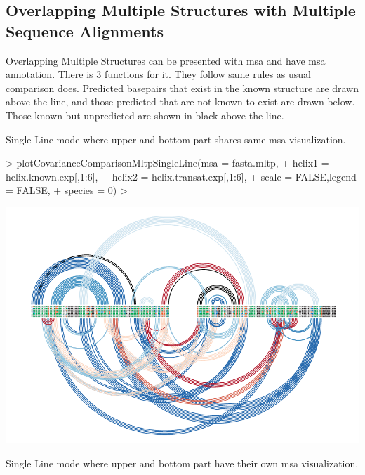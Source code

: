 \documentclass[letterpaper]{article}
\begin{document}
\subsection{Overlapping Multiple Structures with Multiple Sequence Alignments}

Overlapping Multiple Structures can be presented with msa and have msa
annotation. There is 3 functions for it. They follow same rules as usual
comparison does. Predicted basepairs that exist in the known structure are drawn
above the line, and those predicted that are not known to exist are drawn below.
Those known but unpredicted are shown in black above the line.

Single Line mode where upper and bottom part shares same msa visualization.

\begin{Schunk}
\begin{Sinput}
> plotCovarianceComparisonMltpSingleLine(msa = fasta.mltp,
+                                        helix1 = helix.known.exp[,1:6],
+                                        helix2 = helix.transat.exp[,1:6],
+                                        scale = FALSE,legend = FALSE,
+                                        species = 0)
> 
\end{Sinput}
\end{Schunk}
\includegraphics{R4RNA-019}

Single Line mode where upper and bottom part have their own msa visualization.
\end{document}
